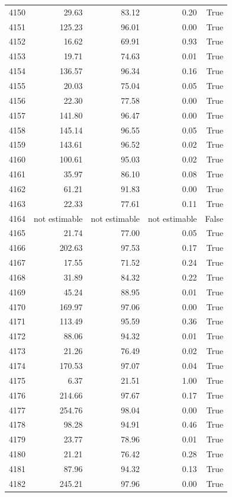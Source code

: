 \begin{longtable}{rrrrr}
4150 & 29.63 & 83.12 & 0.20 & True \\
4151 & 125.23 & 96.01 & 0.00 & True \\
4152 & 16.62 & 69.91 & 0.93 & True \\
4153 & 19.71 & 74.63 & 0.01 & True \\
4154 & 136.57 & 96.34 & 0.16 & True \\
4155 & 20.03 & 75.04 & 0.05 & True \\
4156 & 22.30 & 77.58 & 0.00 & True \\
4157 & 141.80 & 96.47 & 0.00 & True \\
4158 & 145.14 & 96.55 & 0.05 & True \\
4159 & 143.61 & 96.52 & 0.02 & True \\
4160 & 100.61 & 95.03 & 0.02 & True \\
4161 & 35.97 & 86.10 & 0.08 & True \\
4162 & 61.21 & 91.83 & 0.00 & True \\
4163 & 22.33 & 77.61 & 0.11 & True \\
4164 & not estimable & not estimable & not estimable & False \\
4165 & 21.74 & 77.00 & 0.05 & True \\
4166 & 202.63 & 97.53 & 0.17 & True \\
4167 & 17.55 & 71.52 & 0.24 & True \\
4168 & 31.89 & 84.32 & 0.22 & True \\
4169 & 45.24 & 88.95 & 0.01 & True \\
4170 & 169.97 & 97.06 & 0.00 & True \\
4171 & 113.49 & 95.59 & 0.36 & True \\
4172 & 88.06 & 94.32 & 0.01 & True \\
4173 & 21.26 & 76.49 & 0.02 & True \\
4174 & 170.53 & 97.07 & 0.04 & True \\
4175 & 6.37 & 21.51 & 1.00 & True \\
4176 & 214.66 & 97.67 & 0.17 & True \\
4177 & 254.76 & 98.04 & 0.00 & True \\
4178 & 98.28 & 94.91 & 0.46 & True \\
4179 & 23.77 & 78.96 & 0.01 & True \\
4180 & 21.21 & 76.42 & 0.28 & True \\
4181 & 87.96 & 94.32 & 0.13 & True \\
4182 & 245.21 & 97.96 & 0.00 & True \\

\end{longtable}

